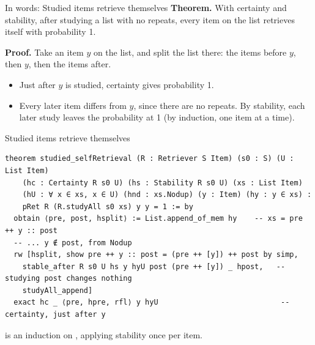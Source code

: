 \documentclass[aspectratio=169,11pt]{beamer}
\begin{document}
\begin{frame}{In words: Studied items retrieve themselves}
  \textbf{Theorem.} With certainty and stability, after studying a list with no repeats, every item on the list retrieves itself with probability 1.
  \bigskip

  \textbf{Proof.} Take an item $y$ on the list, and split the list there: the items before $y$, then $y$, then the items after.
  \begin{itemize}
    \item Just after $y$ is studied, certainty gives probability 1.
    \item Every later item differs from $y$, since there are no repeats. By stability, each later study leaves the probability at 1 (by induction, one item at a time).
  \end{itemize}
\end{frame}


\begin{frame}[fragile]{Studied items retrieve themselves}
\begin{Verbatim}
theorem studied_selfRetrieval (R : Retriever S Item) (s0 : S) (U : List Item)
    (hc : Certainty R s0 U) (hs : Stability R s0 U) (xs : List Item)
    (hU : ∀ x ∈ xs, x ∈ U) (hnd : xs.Nodup) (y : Item) (hy : y ∈ xs) :
    pRet R (R.studyAll s0 xs) y y = 1 := by
  obtain ⟨pre, post, hsplit⟩ := List.append_of_mem hy    -- xs = pre ++ y :: post
  -- ... y ∉ post, from Nodup
  rw [hsplit, show pre ++ y :: post = (pre ++ [y]) ++ post by simp,
    stable_after R s0 U hs y hyU post (pre ++ [y]) _ hpost,   -- studying post changes nothing
    studyAll_append]
  exact hc _ ⟨pre, hpre, rfl⟩ y hyU                            -- certainty, just after y
\end{Verbatim}
  \medskip
   is an induction on , applying stability once per item.
\end{frame}
\end{document}

